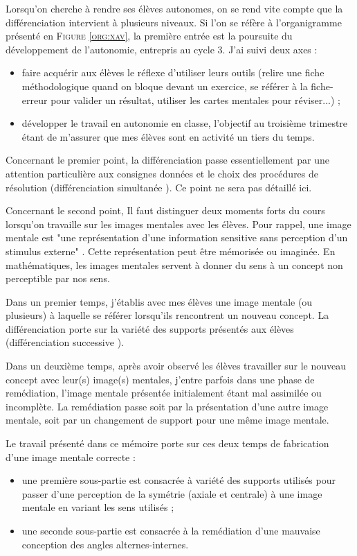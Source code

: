 Lorsqu'on cherche à rendre ses élèves autonomes, on se rend vite compte que la différenciation intervient à plusieurs niveaux. Si l'on se réfère à l'organigramme présenté en \textsc{Figure \ref{org:xav}}, la première entrée est la poursuite du développement de l'autonomie, entrepris au cycle 3. J'ai suivi deux axes :
\begin{itemize}
    \item faire acquérir aux élèves le réflexe d'utiliser leurs outils (relire une fiche méthodologique quand on bloque devant un exercice, se référer à la fiche-erreur pour valider un résultat, utiliser les cartes mentales pour réviser...) ;
    \item développer le travail en autonomie en classe, l'objectif au troisième trimestre étant de m'assurer que mes élèves sont en activité un tiers du temps.
\end{itemize}
Concernant le premier point, la différenciation passe essentiellement par une attention particulière aux consignes données et le choix des procédures de résolution (différenciation simultanée \cite{Eduscol}). Ce point ne sera pas détaillé ici.

Concernant le second point, Il faut distinguer deux moments forts du cours lorsqu'on travaille sur les images mentales avec les élèves. Pour rappel, une image mentale est "une représentation d'une information sensitive sans perception d'un stimulus externe" \cite{mimagery}. Cette représentation peut être mémorisée ou imaginée. En mathématiques, les images mentales servent à donner du sens à un concept non perceptible par nos sens.

Dans un premier temps, j'établis avec mes élèves une image mentale (ou plusieurs) à laquelle se référer lorsqu'ils rencontrent un nouveau concept. La différenciation porte sur la variété des supports présentés aux élèves (différenciation successive \cite{Eduscol}).

Dans un deuxième temps, après avoir observé les élèves travailler sur le nouveau concept avec leur(s) image(s) mentales, j'entre parfois dans une phase de remédiation, l'image mentale présentée initialement étant mal assimilée ou incomplète. La remédiation passe soit par la présentation d'une autre image mentale, soit par un changement de support pour une même image mentale.

Le travail présenté dans ce mémoire porte sur ces deux temps de fabrication d'une image mentale correcte :
\begin{itemize}
    \item une première sous-partie est consacrée à variété des supports utilisés pour passer d'une perception de la symétrie (axiale et centrale) à une image mentale en variant les sens utilisés ;
    \item une seconde sous-partie est consacrée à la remédiation d'une mauvaise conception des angles alternes-internes.
\end{itemize}

